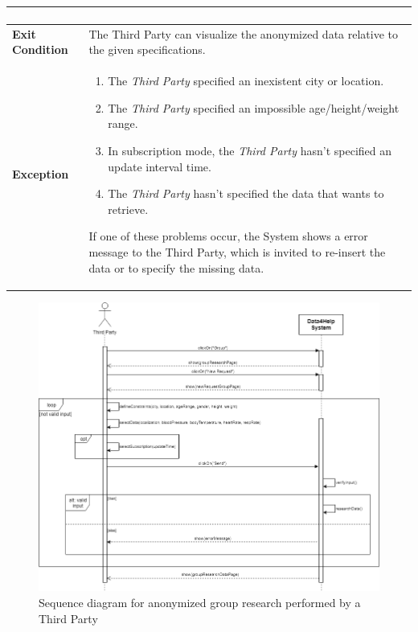 \begin{table}[H]
\begin{tabular}{|p{3.5cm}|p{10.3cm}|}
\begin{enumerate}[leftmargin=0.5cm]
                                          \end{enumerate}
    										\\
    \hline
    \textbf{\large{Exit Condition}} 	& The Third Party can visualize the                                         anonymized data relative to the given                                       specifications. \\
    
    \hline
    \textbf{\large{Exception}} 			& \begin{enumerate}[leftmargin=0.5cm]                                           \item The \emph{Third Party}                                            specified an inexistent city or                                             location.
                                            \item The \emph{Third Party} specified an impossible age/height/weight range.
                                            \item In subscription mode, the \emph{Third Party} hasn't specified an update interval time.
                                            \item The \emph{Third Party} hasn't specified the data that wants to retrieve.
    \end{enumerate}
    										If one of these problems occur, the System shows a error message to the Third Party, which is invited to re-insert the data or to specify the missing data. \\
    
    \hline
    
    \end{tabular}
	
\end{table}
\begin{figure}[H]
    \centering
    \includegraphics[scale=0.4]{./Pictures/groupResearchSeqDiag.png}
    \caption{Sequence diagram for anonymized group research performed by a Third Party}
    
\end{figure}
